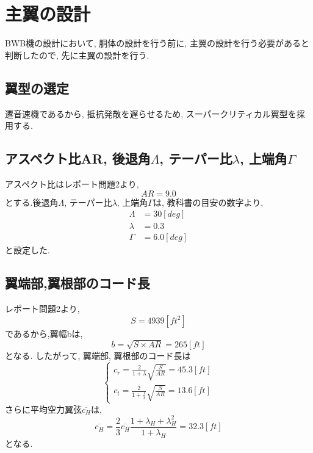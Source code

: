 \documentclass[class=article, crop=false, dvipdfmx, fleqn]{standalone}
\begin{document}
\section{主翼の設計}
BWB機の設計において, 胴体の設計を行う前に, 主翼の設計を行う必要があると判断したので,
先に主翼の設計を行う.
\subsection{翼型の選定}
遷音速機であるから, 抵抗発散を遅らせるため, スーパークリティカル翼型を採用する.

\subsection{アスペクト比AR, 後退角$\Lambda$, テーパー比$\lambda$, 上端角$\Gamma$}
アスペクト比はレポート問題2より,
\begin{equation}
  AR = 9.0
\end{equation}
とする.後退角$\Lambda$, テーパー比$\lambda$, 上端角$\Gamma$は, 教科書の目安の数字より,
\begin{align}
  \Lambda &= 30[deg] \\
  \lambda &= 0.3 \\
  \Gamma &= 6.0[deg]
\end{align}
と設定した.

\subsection{翼端部,翼根部のコード長}
レポート問題2より,
\begin{equation}
  S = 4939[ft^2]
\end{equation}
であるから,翼幅bは,
\begin{equation}
  b = \sqrt{S \times AR} = 265[ft]
\end{equation}
となる. したがって, 翼端部, 翼根部のコード長は
\[
\begin{cases}
  c_{r} = \frac{2}{1 + \lambda}\sqrt{\frac{S}{AR}} = 45.3[ft] \\
  c_{t} = \frac{2}{1 + \frac{1}{\lambda}}\sqrt{\frac{S}{AR}} = 13.6[ft]
\end{cases}
\]
さらに平均空力翼弦$\overline{c_H}$は,
\begin{equation}
  \overline{c_H} = \frac{2}{3} \overline{c_H}
  \frac{1 + \lambda_H +\lambda_H^2}{1 + \lambda_H}
  = 32.3[ft]
\end{equation}
となる.
\end{document}
